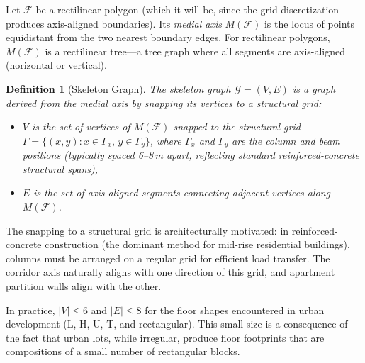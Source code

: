 \documentclass[11pt,a4paper]{article}
\newtheorem{definition}{Definition}
\newcommand{\calF}{\mathcal{F}}
\newcommand{\calG}{\mathcal{G}}
\begin{document}
Let $\calF$ be a rectilinear polygon (which it will be, since the grid
discretization produces axis-aligned boundaries). Its \emph{medial axis}
$M(\calF)$ is the locus of points equidistant from the two nearest
boundary edges. For rectilinear polygons, $M(\calF)$ is a rectilinear
tree---a tree graph where all segments are axis-aligned (horizontal or
vertical).

\begin{definition}[Skeleton Graph]
The \emph{skeleton graph} $\calG = (V, E)$ is a graph derived from the
medial axis by snapping its vertices to a structural grid:
\begin{itemize}[nosep]
    \item $V$ is the set of vertices of $M(\calF)$ snapped to the
    structural grid $\Gamma = \{(x,y) : x \in \Gamma_x,\, y \in
    \Gamma_y\}$, where $\Gamma_x$ and $\Gamma_y$ are the column and
    beam positions (typically spaced 6--8\,m apart, reflecting
    standard reinforced-concrete structural spans),
    \item $E$ is the set of axis-aligned segments connecting adjacent
    vertices along $M(\calF)$.
\end{itemize}
\end{definition}

The snapping to a structural grid is architecturally motivated: in
reinforced-concrete construction (the dominant method for mid-rise
residential buildings), columns must be arranged on a regular grid for
efficient load transfer. The corridor axis naturally aligns with one
direction of this grid, and apartment partition walls align with the
other.

In practice, $|V| \leq 6$ and $|E| \leq 8$ for the floor shapes
encountered in urban development (L, H, U, T, and rectangular). This
small size is a consequence of the fact that urban lots, while
irregular, produce floor footprints that are compositions of a small
number of rectangular blocks.
\end{document}
